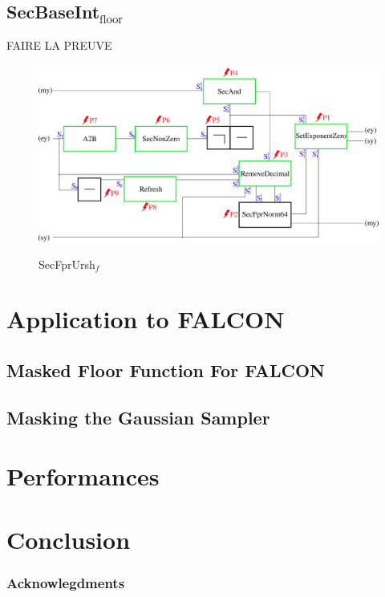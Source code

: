 \documentclass[runningheads]{llncs}
\begin{document}
\subsection{SecBaseInt$_\text{floor}$}

FAIRE LA PREUVE

\begin{figure}[h!]
  \centering
  \includegraphics[width=1\textwidth]{figure/secbaseint.pdf}
  \label{fig:Secfprursh}
  \caption{SecFprUrsh$_f$}
\end{figure}
\newpage

\section{Application to FALCON}\label{sec:appfalcon}
\subsection{Masked Floor Function For FALCON}
\subsection{Masking the Gaussian Sampler}
\section{Performances}\label{sec:perf}



\section{Conclusion}\label{sec:conclusion}
\subsubsection{Acknowlegdments}

%
%
%
\end{document}
